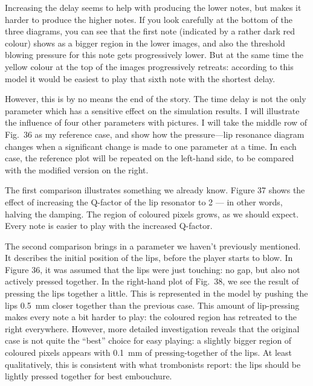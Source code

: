   Increasing the delay seems to help with producing the lower notes, but makes 
  it harder to produce the higher notes. If you look carefully at the bottom of 
  the three diagrams, you can see that the first note (indicated by a rather 
  dark red colour) shows as a bigger region in the lower images, and also the 
  threshold blowing pressure for this note gets progressively lower. But at the 
  same time the yellow colour at the top of the images progressively retreats: 
  according to this model it would be easiest to play that sixth note with the 
  shortest delay. 

  However, this is by no means the end of the story. The time delay is not the 
  only parameter which has a sensitive effect on the simulation results. I will 
  illustrate the influence of four other parameters with pictures. I will take 
  the middle row of Fig.\ 36 as my reference case, and show how the 
  pressure—lip resonance diagram changes when a significant change is made to 
  one parameter at a time. In each case, the reference plot will be repeated on 
  the left-hand side, to be compared with the modified version on the right. 

  The first comparison illustrates something we already know. Figure 37 shows 
  the effect of increasing the Q-factor of the lip resonator to 2 — in other 
  words, halving the damping. The region of coloured pixels grows, as we should 
  expect. Every note is easier to play with the increased Q-factor. 



  The second comparison brings in a parameter we haven’t previously mentioned. 
  It describes the initial position of the lips, before the player starts to 
  blow. In Figure 36, it was assumed that the lips were just touching: no gap, 
  but also not actively pressed together. In the right-hand plot of Fig.\ 38, 
  we see the result of pressing the lips together a little. This is represented 
  in the model by pushing the lips 0.5~mm closer together than the previous 
  case. This amount of lip-pressing makes every note a bit harder to play: the 
  coloured region has retreated to the right everywhere. However, more detailed 
  investigation reveals that the original case is not quite the “best” choice 
  for easy playing: a slightly bigger region of coloured pixels appears with 
  0.1~mm of pressing-together of the lips. At least qualitatively, this is 
  consistent with what trombonists report: the lips should be lightly pressed 
  together for best embouchure. 

